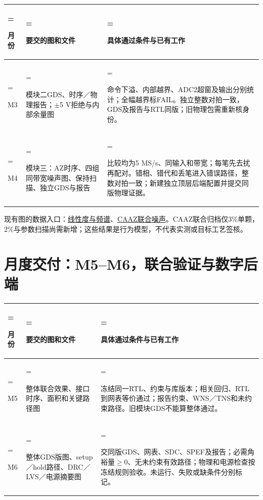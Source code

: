\documentclass[zihao=5,a4paper,fontset=none]{ctexart}
\begin{document}
\begin{table}[H]
\small
  \centering
  \begin{tabularx}{\linewidth}{>{\hsize=0.65\hsize\linewidth=\hsize\raggedright\arraybackslash}X>{\hsize=1.25\hsize\linewidth=\hsize\raggedright\arraybackslash}X>{\hsize=1.1\hsize\linewidth=\hsize\raggedright\arraybackslash}X}
    \toprule
    月份 & 要交的图和文件 & 具体通过条件与已有工作 \\
    \midrule
    M3 & 模块二GDS、时序／物理报告；$\pm$5 V拒绝与内部余量图 & 命令下溢、内部越界、ADC2超窗及输出分别统计；全幅越界标FAIL。独立整数对拍一致，GDS及报告与RTL同版；旧物理包需重新核身份。 \\
    M4 & 模块三：AZ时序、四组同带宽噪声图、保持扫描、独立GDS与报告 & 比较均为5 MS/s、同输入和带宽；每笔先去扰再配对。错相、错代和丢笔进入错误路径，整数对拍一致；新建独立顶层后端配置并提交同版物理证据。 \\
    \bottomrule
  \end{tabularx}
\end{table}

现有图的数据入口：\href{../task2/evidence/eight_negative/README.md}{线性度与频谱}、\href{../task3/evidence/negative/joint_noise/summary.json}{CAAZ联合噪声}。CAAZ联合归档仅3\%单颗，2\%与参数扫描尚需新增；这些结果是行为模型，不代表实测或目标工艺签核。


\clearpage
\section{月度交付：M5--M6，联合验证与数字后端}

\begin{table}[H]
\small
  \centering
  \begin{tabularx}{\linewidth}{>{\hsize=0.65\hsize\linewidth=\hsize\raggedright\arraybackslash}X>{\hsize=1.25\hsize\linewidth=\hsize\raggedright\arraybackslash}X>{\hsize=1.1\hsize\linewidth=\hsize\raggedright\arraybackslash}X}
    \toprule
    月份 & 要交的图和文件 & 具体通过条件与已有工作 \\
    \midrule
    M5 & 整体联合效果、接口时序、面积和关键路径图 & 冻结同一RTL、约束与库版本；相关回归、RTL到网表等价通过；报告约束、WNS／TNS和未约束路径。旧模块GDS不能算整体通过。 \\
    M6 & 整体GDS版图、setup／hold路径、DRC／LVS／电源摘要图 & 交同版GDS、网表、SDC、SPEF及报告；必需角裕量$\geq$0、无未约束有效路径；物理和电源检查按冻结规则验收。未运行、失败或缺条件分别标记。 \\
    \bottomrule
  \end{tabularx}
\end{table}
\end{document}
